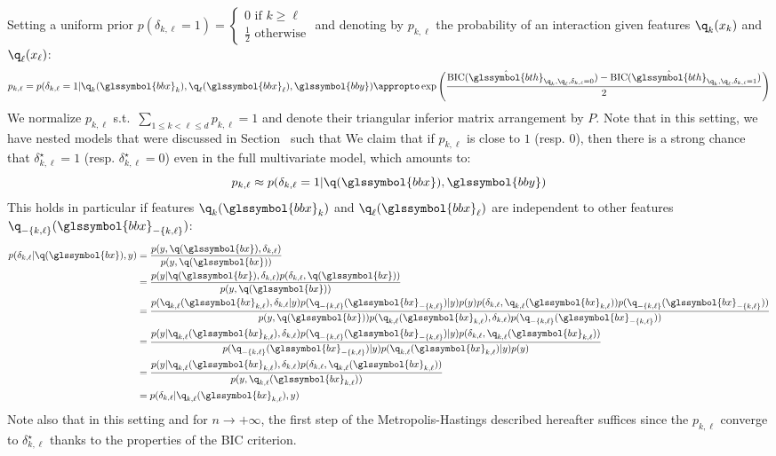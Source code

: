Setting a uniform prior $p(\delta_{k,\ell}=1) =\begin{cases} 0 \text{ if } k \geq \ell \\ \frac{1}{2} \text{ otherwise} \end{cases}$ and denoting by $p_{k,\ell}$ the probability of an interaction given features $\q_k(x_k)$ and $\q_\ell(x_\ell)$:
\begin{equation} \label{eq:pkl}
p_{k,\ell} = p(\delta_{k,\ell} = 1 | \q_k(\glssymbol{bbx}_k), \q_\ell(\glssymbol{bbx}_\ell), \glssymbol{bby}) \appropto \exp \left( \frac{\text{BIC}(\hat{\glssymbol{bth}}_{\q_k,\q_\ell,\delta_{k,\ell}=0}) - \text{BIC}(\hat{\glssymbol{bth}}_{\q_k,\q_\ell,\delta_{k,\ell}=1})}{2} \right)
\end{equation}
We normalize $p_{k,\ell}$ s.t.\ $\sum_{1 \leq k < \ell \leq d} p_{k,\ell} = 1$ and denote their triangular inferior matrix arrangement by $P$. Note that in this setting, we have nested models that were discussed in Section~ such that 
We claim that if $p_{k,\ell}$ is close to $1$ (resp. $0$), then there is a strong chance that $\delta_{k,\ell}^\star = 1$ (resp. $\delta_{k,\ell}^\star = 0$) even in the full multivariate model, which amounts to:
\[ p_{k,\ell} \approx p(\delta_{k,\ell} = 1 | \q(\glssymbol{bbx}),\glssymbol{bby}) \]
This holds in particular if features $\q_k(\glssymbol{bbx}_k)$ and $\q_\ell(\glssymbol{bbx}_\ell)$ are independent to other features $\q_{-\{k,\ell\}}(\glssymbol{bbx}_{-\{k,\ell\}})$:
\begin{align*}
p(\delta_{k,\ell} | \q(\glssymbol{bx}),y) & = \frac{p(y , \q(\glssymbol{bx}), \delta_{k,\ell})}{p(y , \q(\glssymbol{bx}))} \\
 & = \frac{p(y | \q(\glssymbol{bx}),\delta_{k,\ell}) p(\delta_{k,\ell}, \q(\glssymbol{bx}))}{p(y,\q(\glssymbol{bx}))} \\
 & = \frac{p(\q_{k,\ell}(\glssymbol{bx}_{k,\ell}),\delta_{k,\ell} | y) p(\q_{-\{k,\ell\}}(\glssymbol{bx}_{-\{k,\ell\}}) | y) p(y) p(\delta_{k,\ell},\q_{k,\ell}(\glssymbol{bx}_{k,\ell})) p(\q_{-\{k,\ell\}}(\glssymbol{bx}_{-\{k,\ell\}})) }{p(y,\q(\glssymbol{bx})) p(\q_{k,\ell}(\glssymbol{bx}_{k,\ell}),\delta_{k,\ell}) p(\q_{-\{k,\ell\}}(\glssymbol{bx}_{-\{k,\ell\}}))} \\
 & = \frac{p(y | \q_{k,\ell}(\glssymbol{bx}_{k,\ell}),\delta_{k,\ell}) p(\q_{-\{k,\ell\}}(\glssymbol{bx}_{-\{k,\ell\}}) | y) p(\delta_{k,\ell},\q_{k,\ell}(\glssymbol{bx}_{k,\ell}))}{p(\q_{-\{k,\ell\}}(\glssymbol{bx}_{-\{k,\ell\}}) | y) p(\q_{k,\ell}(\glssymbol{bx}_{k,\ell}) | y) p(y) } \\
 & = \frac{p(y | \q_{k,\ell}(\glssymbol{bx}_{k,\ell}),\delta_{k,\ell}) p(\delta_{k,\ell},\q_{k,\ell}(\glssymbol{bx}_{k,\ell}))}{p(y , \q_{k,\ell}(\glssymbol{bx}_{k,\ell}))} \\
 & = p(\delta_{k,\ell} | \q_{k,\ell}(\glssymbol{bx}_{k,\ell}), y)
\end{align*}
Note also that in this setting and for $n \to +\infty$, the first step of the Metropolis-Hastings described hereafter suffices since the $p_{k,\ell}$ converge to $\delta_{k,\ell}^\star$ thanks to the properties of the BIC criterion.

